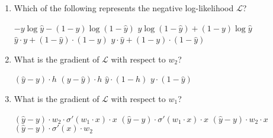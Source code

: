 \documentclass[12pt,letterpaper, onecolumn]{exam}
\begin{document}
\begin{questions}
\begin{enumerate}[label=(\alph*)]
    \item Which of the following represents the negative log-likelihood \( \mathcal{L} \)?
    \begin{choices}
        \choice \( -y \log \hat{y} - (1-y) \log (1-\hat{y}) \)
        \choice \( y \log (1-\hat{y}) + (1-y) \log \hat{y} \)
        \choice \( \hat{y} \cdot y + (1-\hat{y}) \cdot (1-y) \)
        \choice \( y \cdot \hat{y} + (1-y) \cdot (1-\hat{y}) \)
    \end{choices}
    \item What is the gradient of \( \mathcal{L} \) with respect to \( w_2 \)?
    \begin{choices}
        \choice \( (\hat{y} - y) \cdot h \)
        \choice \( (y - \hat{y}) \cdot h \)
        \choice \( \hat{y} \cdot (1 - h) \)
        \choice \( y \cdot (1 - \hat{y}) \)
    \end{choices}
    \item What is the gradient of \( \mathcal{L} \) with respect to \( w_1 \)?
    \begin{choices}
        \choice \( (\hat{y} - y) \cdot w_2 \cdot \sigma'(w_1 \cdot x) \cdot x \)
        \choice \( (\hat{y} - y) \cdot \sigma'(w_1 \cdot x) \cdot x \)
        \choice \( (\hat{y} - y) \cdot w_2 \cdot x \)
        \choice \( (\hat{y} - y) \cdot \sigma'(x) \cdot w_2 \)
    \end{choices}
\end{enumerate}


\begin{solution}
    \begin{parts}
        \part 
        \part 
        \part 
    \end{parts}
\end{solution}


\end{questions}
\end{document}
